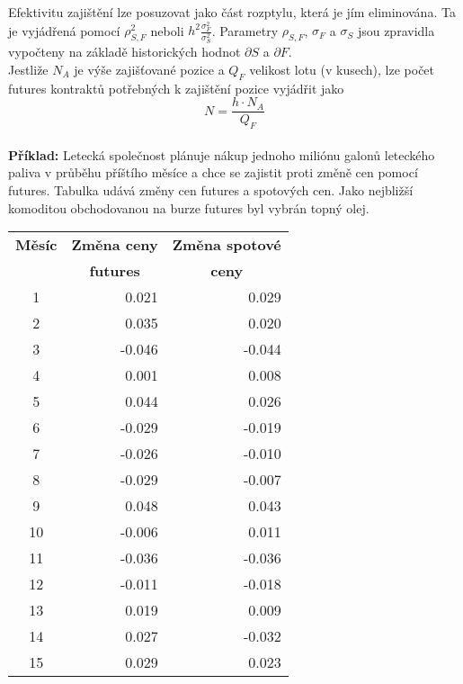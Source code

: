 \documentclass[a4paper]{book}
\begin{document}
Efektivitu zajištění lze posuzovat jako část rozptylu, která je jím eliminována. Ta je vyjádřená pomocí $\rho_{S,F}^2$ neboli $h^2 \frac{\sigma_F^2}{\sigma_S^2}$. Parametry $\rho_{S,F}$, $\sigma_F$ a $\sigma_S$ jsou zpravidla vypočteny na základě historických hodnot $\partial S$ a $\partial F$.\\

Jestliže $N_A$ je výše zajišťované pozice a $Q_F$ velikost lotu (v kusech), lze počet futures kontraktů potřebných k zajištění pozice vyjádřit jako
\begin{equation*}
N = \frac{h \cdot N_A}{Q_F}
\end{equation*}\\

\noindent \textbf{Příklad:} Letecká společnost plánuje nákup jednoho miliónu galonů leteckého paliva v průběhu příštího měsíce a chce se zajistit proti změně cen pomocí futures. Tabulka udává změny cen futures a spotových cen. Jako nejbližší komoditou obchodovanou na burze futures byl vybrán topný olej.\\

\begin{center}
\begin{tabular}{c r r}
\textbf{Měsíc} &
\multicolumn {1}{c}{\textbf{Změna ceny}} & 
\multicolumn {1}{c}{\textbf{Změna spotové}} \\
\textbf{} &
\multicolumn {1}{c}{\textbf{futures}} & 
\multicolumn {1}{c}{\textbf{ceny}}\\
\hline
 1 &  0.021 &  0.029 \\
 2 &  0.035 &  0.020 \\
 3 & -0.046 & -0.044 \\
 4 &  0.001 &  0.008 \\
 5 &  0.044 &  0.026 \\
 6 & -0.029 & -0.019 \\
 7 & -0.026 & -0.010 \\
 8 & -0.029 & -0.007 \\
 9 &  0.048 &  0.043 \\
10 & -0.006 &  0.011 \\
11 & -0.036 & -0.036 \\
12 & -0.011 & -0.018 \\
13 &  0.019 &  0.009 \\
14 &  0.027 & -0.032 \\
15 &  0.029 &  0.023 \\
\hline 
\end{tabular}
\end{center}
\end{document}
